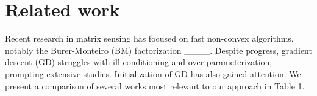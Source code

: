 \section{Related work}


Recent research in matrix sensing has focused on fast non-convex algorithms, notably the Burer-Monteiro (BM) factorization ____. Despite progress, gradient descent (GD) struggles with ill-conditioning and over-parameterization, prompting extensive studies. Initialization of GD has also gained attention. We present a comparison of several works most relevant to our approach in Table 1.

